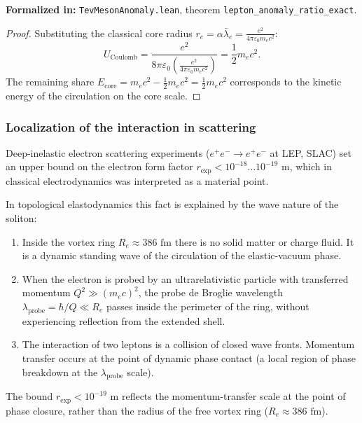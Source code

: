 \documentclass[11pt,a4paper]{article}
\providecommand{\lambdabar}{\bar{\lambda}}
\theoremstyle{definition}
\theoremstyle{remark}
\begin{document}
\noindent\small\textbf{Formalized in:} \texttt{TevMesonAnomaly.lean}, theorem \texttt{lepton_anomaly_ratio_exact}.


\begin{proof}
Substituting the classical core radius $r_e = \alpha \lambdabar_e = \frac{e^2}{4\pi\varepsilon_0 m_e c^2}$:
\begin{equation}
	U_{\mathrm{Coulomb}} = \frac{e^2}{8\pi\varepsilon_0 \left(\frac{e^2}{4\pi\varepsilon_0 m_e c^2}\right)} = \frac{1}{2} m_e c^2.
\end{equation}
The remaining share $E_{\mathrm{core}} = m_e c^2 - \frac{1}{2}m_e c^2 = \frac{1}{2}m_e c^2$ corresponds to the kinetic energy of the circulation on the core scale.
\end{proof}
	
\subsubsection{Localization of the interaction in scattering}
	
Deep-inelastic electron scattering experiments ($e^+ e^- \to e^+ e^-$ at LEP, SLAC) set an upper bound on the electron form factor $r_{\mathrm{exp}} < 10^{-18}\dots 10^{-19}\text{ m}$, which in classical electrodynamics was interpreted as a material point.
	
In topological elastodynamics this fact is explained by the wave nature of the soliton:
\begin{enumerate}
\item Inside the vortex ring $R_e \approx 386\text{ fm}$ there is no solid matter or charge fluid. It is a dynamic standing wave of the circulation of the elastic-vacuum phase.
\item When the electron is probed by an ultrarelativistic particle with transferred momentum $Q^2 \gg (m_e c)^2$, the probe de Broglie wavelength $\lambda_{\mathrm{probe}} = \hbar / Q \ll R_e$ passes inside the perimeter of the ring, without experiencing reflection from the extended shell.
\item The interaction of two leptons is a collision of closed wave fronts. Momentum transfer occurs at the point of dynamic phase contact (a local region of phase breakdown at the $\lambda_{\mathrm{probe}}$ scale).
\end{enumerate}
The bound $r_{\mathrm{exp}} < 10^{-19}\text{ m}$ reflects the momentum-transfer scale at the point of phase closure, rather than the radius of the free vortex ring ($R_e \approx 386\text{ fm}$).
	
\end{document}
